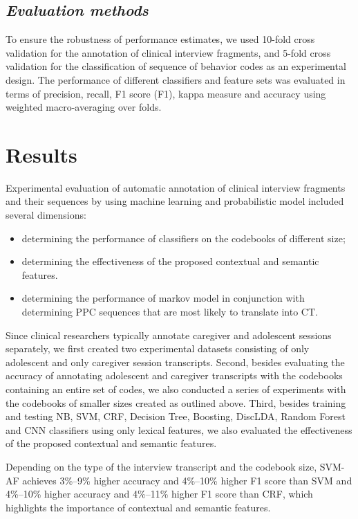 \documentclass{amia}
\begin{document}
\subsection*{\textit{Evaluation methods}}
To ensure the robustness of performance estimates, we used 10-fold cross validation for the annotation of clinical interview fragments, and 5-fold cross validation for the classification of sequence of behavior codes \cite{} as an experimental design. The performance of different classifiers and feature sets was evaluated in terms of precision, recall, F1 score (F1), kappa measure and accuracy using weighted macro-averaging over folds.

\section*{Results}
Experimental evaluation of automatic annotation of clinical interview fragments and their sequences by using machine learning and probabilistic model included several dimensions:
\begin{itemize}
\item determining the performance of classifiers on the codebooks of different size;
\item determining the effectiveness of the proposed contextual and semantic features.
\item determining the performance of markov model in conjunction with determining PPC sequences that are most likely to translate into CT.
\end{itemize}

Since clinical researchers typically annotate caregiver and adolescent sessions separately, we first created two experimental datasets consisting of only adolescent and only caregiver session transcripts. Second, besides evaluating the accuracy of annotating adolescent and caregiver transcripts with the codebooks containing an entire set of codes, we also conducted a series of experiments with the codebooks of smaller sizes created as outlined above. Third, besides training and testing NB, SVM, CRF, Decision Tree, Boosting, DiscLDA, Random Forest and CNN classifiers using only lexical features, we also evaluated the effectiveness of the proposed contextual and semantic features.

Depending on the type of the interview transcript and the codebook size, SVM-AF achieves 3\%--9\% higher accuracy and 4\%--10\% higher F1 score than SVM and 4\%--10\% higher accuracy and 4\%--11\% higher F1 score than CRF, which highlights the importance of contextual and semantic features. 
\end{document}
